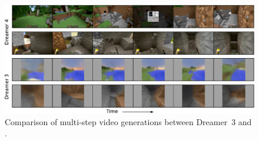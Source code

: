 \begin{figure}[h!]
\centering
\includegraphics[width=\linewidth]{figures/openl/openl}
\vspace*{-3ex}
\caption{Comparison of multi-step video generations between Dreamer~3 and \method.
}
\label{fig:openl}
\vspace*{-1ex}
\end{figure}
